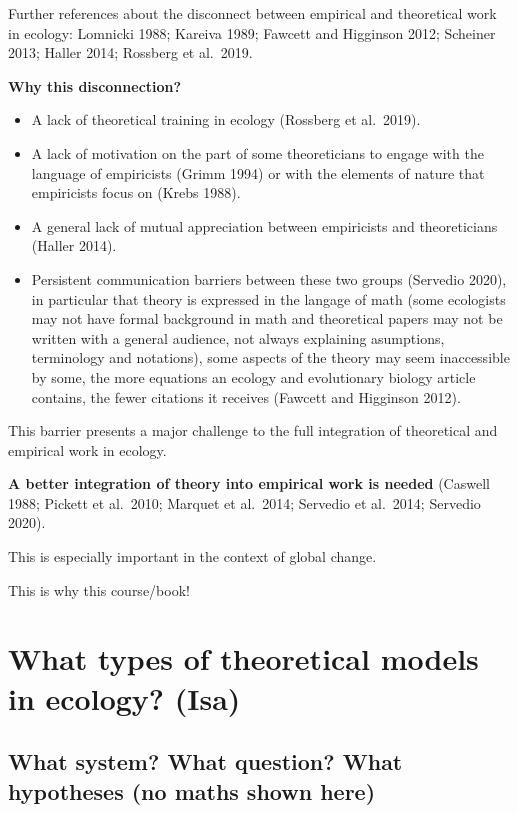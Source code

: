 \documentclass[
]{book}
\providecommand{\tightlist}{%
  \setlength{\itemsep}{0pt}\setlength{\parskip}{0pt}}
\theoremstyle{definition}
\theoremstyle{definition}
\theoremstyle{definition}
\theoremstyle{definition}
\theoremstyle{remark}
\begin{document}
Further references about the disconnect between empirical and theoretical work in ecology: Lomnicki 1988; Kareiva 1989; Fawcett and Higginson 2012; Scheiner 2013; Haller 2014; Rossberg et al.~2019.

\textbf{Why this disconnection?}

\begin{itemize}
\tightlist
\item
  A lack of theoretical training in ecology (Rossberg et al.~2019).
\item
  A lack of motivation on the part of some theoreticians to engage with the language of empiricists (Grimm 1994) or with the elements of nature that empiricists focus on (Krebs 1988).
\item
  A general lack of mutual appreciation between empiricists and theoreticians (Haller 2014).
\item
  Persistent communication barriers between these two groups (Servedio 2020), in particular that theory is expressed in the langage of math (some ecologists may not have formal background in math and theoretical papers may not be written with a general audience, not always explaining asumptions, terminology and notations), some aspects of the theory may seem inaccessible by some, the more equations an ecology and evolutionary biology article contains, the fewer citations it receives (Fawcett and Higginson 2012).
\end{itemize}

This barrier presents a major challenge to the full integration of theoretical and empirical work in ecology.

\textbf{A better integration of theory into empirical work is needed} (Caswell 1988; Pickett et al.~2010; Marquet et al.~2014; Servedio et al.~2014; Servedio 2020).

This is especially important in the context of global change.

This is why this course/book!

\chapter{What types of theoretical models in ecology? (Isa)}\label{what-types-of-theoretical-models-in-ecology-isa}

\section{What system? What question? What hypotheses (no maths shown here)}\label{what-system-what-question-what-hypotheses-no-maths-shown-here}
\end{document}
